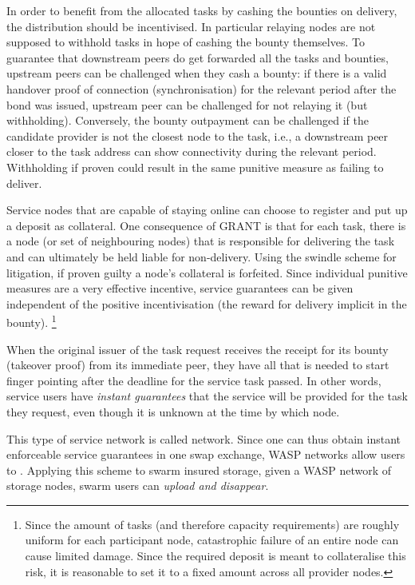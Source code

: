 In order to benefit from the allocated tasks by cashing the bounties on delivery, the distribution
should be incentivised. In particular relaying nodes are not supposed to withhold tasks in hope of cashing the bounty themselves. To guarantee that downstream peers do get forwarded all the tasks and bounties, upstream peers can be challenged when they cash a bounty: if there is a valid handover proof of connection (synchronisation) for the relevant period after the bond was issued, upstream peer can be challenged for not relaying it (but withholding). Conversely, the bounty outpayment can be challenged if the candidate provider is not the closest node to the task, i.e., a downstream peer closer to the task address can show connectivity during the relevant period. Withholding if proven could result in the same punitive measure as failing to deliver.


Service nodes that are capable of staying online can choose to register and put up a deposit as collateral. One consequence of GRANT is that for each task, there is a node (or set of neighbouring nodes) that is responsible for delivering the task and can ultimately be held liable for non-delivery. Using the swindle scheme for litigation, if proven guilty a node's collateral is forfeited. Since individual punitive measures are a very effective incentive, service guarantees can be given independent of the positive incentivisation (the reward for delivery implicit in the bounty).%
%
\footnote{Since the amount of tasks (and therefore capacity requirements) are roughly uniform for each participant node, catastrophic failure of an entire node can cause limited damage. Since the required deposit is meant to collateralise this risk, it is reasonable to set it to a fixed amount across all provider nodes.}

When the original issuer of the task request receives the receipt for its bounty (takeover proof) from its immediate peer, they have all that is needed to start finger pointing after the deadline for the service task passed. In other words, service users have \emph{instant guarantees} that the service will be provided for the task they request, even though it is unknown at the time by which node.

This type of service network is called  network.
Since one can thus obtain instant enforceable service guarantees in one swap exchange, WASP networks allow users to . Applying this scheme to swarm insured storage, given a WASP network of storage nodes, swarm users can \emph{upload and disappear}.

